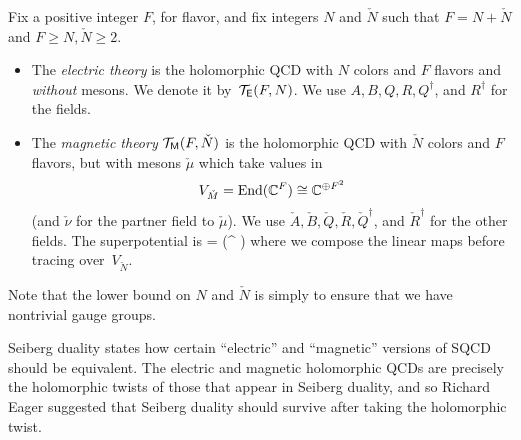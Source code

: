 \documentclass[11pt]{amsart}
\def\SU{{\rm SU}}
\begin{document}
\begin{dfn}
Fix a positive integer $F$, for flavor, and fix integers $N$ and $\check{N}$ such that $F = N + \check{N}$ and $F \geq N, \check{N} \geq 2$.
\begin{itemize}
\item
The {\em electric theory} is the holomorphic QCD with $N$ colors and $F$ flavors and {\em without} mesons.
We denote it by~$\mathcal T_{\mathsf E}(F, N)$.
We use $A, B, Q, R, Q^\dag$, and $R^\dag$ for the fields.
\item
The {\em magnetic theory} $\mathcal T_{{\sf M}}(F, \check{N})$ is the holomorphic QCD with $\check{N}$ colors and $F$ flavors, but with mesons $\check{\mu}$ which take values in $$V_{\check{M}} = {\rm End}(\mathbb C^F) \cong \mathbb C^{\oplus F^2}$$
(and $\check{\nu}$ for the partner field to $\check{\mu}$).
We use $\check{A}, \check{B}, \check{Q}, \check{R}, \check{Q}^\dag$, and $\check{R}^\dag$ for the other fields.
The superpotential is 
\beqn\label{eqn:checkW}
 =  \Tr(^\dag \check{\mu}  )
\eeqn
where we compose the linear maps before tracing over~$V_{\check{N}}$.
\end{itemize}
\end{dfn}


Note that the lower bound on $N$ and $\check{N}$ is simply to ensure that we have nontrivial gauge groups.


Seiberg duality states how certain ``electric'' and ``magnetic'' versions of SQCD should be equivalent.
The electric and magnetic holomorphic QCDs are precisely the holomorphic twists of those that appear in Seiberg duality,
and so Richard Eager suggested that Seiberg duality should survive after taking the holomorphic twist.
\end{document}
